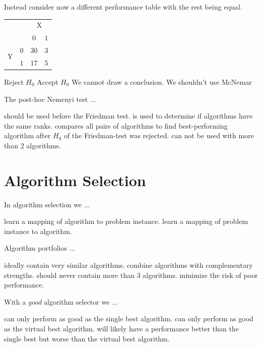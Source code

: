\documentclass{exam}
\begin{document}
\begin{questions}
		\question Instead consider now a different performance table with the rest being equal.
		\begin{center}
			\begin{tabular}{cc|cc}
				& & \multicolumn{2}{c}{X} \\
				& & $0$ & $1$ \\
				\hline
				\multirow{2}{*}{Y} & $0$ & 30 & 3 \\
				& $1$ & 17 & 5 \\
			\end{tabular}
		\end{center}
		\begin{choices}
			\choice Reject $H_0$
			\choice Accept $H_0$
			\choice We cannot draw a conclusion.
			\choice We shouldn't use McNemar %
		\end{choices}
		
		\question The post-hoc Nemenyi test ...
		\begin{choices}
			\choice should be used before the Friedman test.
			\choice is used to determine if algorithms have the same ranks.
			\choice compares all pairs of algorithms to find best-performing algorithm after $H_0$ of the
			Friedman-test was rejected. %
			\choice can not be used with more than 2 algorithms.
		\end{choices}
		
		\pagebreak
		\section{Algorithm Selection}
		
		\question In algorithm selection we ...
		\begin{choices}
			\choice learn a mapping of algorithm to problem instance.
			\choice learn a mapping of problem instance to algorithm. %
		\end{choices}
		
		\question Algorithm portfolios ...
		\begin{choices}
			\choice ideally contain very similar algorithms.
			\choice combine algorithms with complementary strengths. %
			\choice should never contain more than $3$ algorithms.
			\choice minimize the risk of poor performance. %
		\end{choices}
		
		\question With a \textit{good} algorithm selector we ...
		\begin{choices}
			\choice can only perform as good as the single best algorithm.
			\choice can only perform as good as the virtual best algorithm. %
			\choice will likely have a performance better than the single best but worse than the virtual best algorithm. %
		\end{choices}
		

\end{questions}
\end{document}

